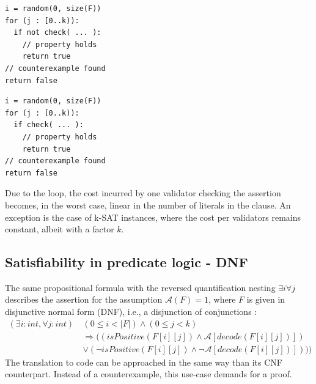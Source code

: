 \vspace{\baselineskip}
\noindent
\begin{minipage}{.45\textwidth}
\begin{lstlisting}[label=lst:cnf_code_neg, numbers=none]
i = random(0, size(F))
for (j : [0..k)):
  if not check( ... ):
    // property holds
    return true
// counterexample found
return false
\end{lstlisting}
\end{minipage}\hfill
\begin{minipage}{.45\textwidth}
\begin{lstlisting}[label=lst:cnf_code, numbers=none]
i = random(0, size(F))
for (j : [0..k)):
  if check( ... ):
    // property holds
    return true
// counterexample found
return false
\end{lstlisting}
\end{minipage}
\vspace{\baselineskip}

Due to the loop, the cost incurred by one validator checking the assertion becomes, in the worst case, linear in the number of literals in the clause. An exception is the case of k-SAT instances, where the cost per validators remains constant, albeit with a factor $k$. 

\subsection{Satisfiability in predicate logic - DNF}\label{sec:dnf}
The same propositional formula with the reversed quantification nesting $\exists i \forall j$ describes the assertion for the assumption $\mathcal{A}(F) = 1$, where $F$ is given in disjunctive normal form (DNF), i.e., a disjunction of conjunctions \cite{dnf_math_encycl}:
\begin{equation}\label{eq:dnf_sat}
\begin{aligned}
(\exists i : int, \forall j : int) \: &(0 \leq i < |F|) \wedge (0 \leq j < k) \\
&\Rightarrow ((isPositive(F[i][j]) \wedge \mathcal{A}[decode(F[i][j])]) \\
&\vee (\neg isPositive(F[i][j]) \wedge \neg \mathcal{A}[decode(F[i][j])])))
\end{aligned}
\end{equation}
The translation to code can be approached in the same way than its CNF counterpart. Instead of a counterexample, this use-case demands for a proof.

